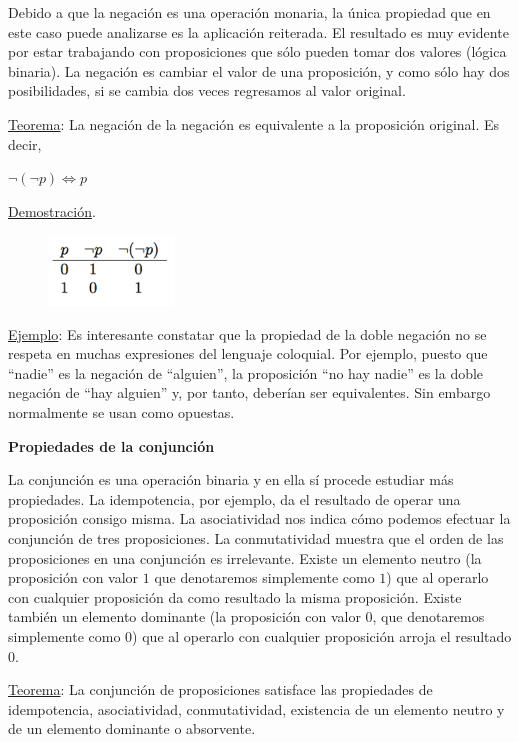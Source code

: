 Debido a que la negación es una operación monaria, la única propiedad que en este caso puede analizarse es la aplicación reiterada. El resultado es muy evidente por estar trabajando con proposiciones que sólo pueden tomar dos valores (lógica binaria). La negación es cambiar el valor de una proposición, y como sólo hay dos posibilidades, si se cambia dos veces regresamos al valor original.

\underline{Teorema}: La negación de la negación es equivalente a la proposición original. Es decir, 

\centerline{$\neg (\neg p) \Leftrightarrow p$}

\underline{Demostración}. 
	\begin{figure}[H] 
		\centering
		\includegraphics[width=0.3\textwidth]{imagenes/apendices/APENDICESIM23.png}
	\end{figure}
\rightline{$\Box$}


\underline{Ejemplo}: Es interesante constatar que la propiedad de la doble negación no se respeta en muchas expresiones del lenguaje coloquial. Por ejemplo, puesto que “nadie” es la negación de “alguien”, la proposición “no hay nadie” es la doble negación de “hay alguien” y, por tanto, deberían ser equivalentes. Sin embargo normalmente se usan como opuestas. 

\textbf{Propiedades de la conjunción}

La conjunción es una operación binaria y en ella sí procede estudiar más propiedades. La idempotencia, por ejemplo, da el resultado de operar una proposición consigo misma. La asociatividad nos indica cómo podemos efectuar la conjunción de tres proposiciones. La conmutatividad muestra que el orden de las proposiciones en una conjunción es irrelevante. Existe un elemento neutro (la proposición con valor $1$ que denotaremos simplemente como $1$) que al operarlo con cualquier proposición da como resultado la misma proposición. Existe también un elemento dominante (la proposición con valor $0$, que denotaremos simplemente como $0$) que al operarlo con cualquier proposición arroja el resultado $0$.

\underline{Teorema}: La conjunción de proposiciones satisface las propiedades de idempotencia, asociatividad, conmutatividad, existencia de un elemento neutro y de un elemento dominante o absorvente.

